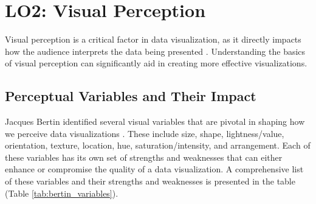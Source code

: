 \section{LO2: Visual Perception}
Visual perception is a critical factor in data visualization, as it directly impacts how the audience interprets the data being presented \cite{wareInformationVisualizationPerception2013a}. Understanding the basics of visual perception can significantly aid in creating more effective visualizations.

\subsection{Perceptual Variables and Their Impact}
Jacques Bertin identified several visual variables that are pivotal in shaping how we perceive data visualizations \cite{bertinSemiologyGraphicsDiagrams2011}. These include size, shape, lightness/value, orientation, texture, location, hue, saturation/intensity, and arrangement. Each of these variables has its own set of strengths and weaknesses that can either enhance or compromise the quality of a data visualization. A comprehensive list of these variables and their strengths and weaknesses is presented in the table (Table \ref{tab:bertin_variables}).

